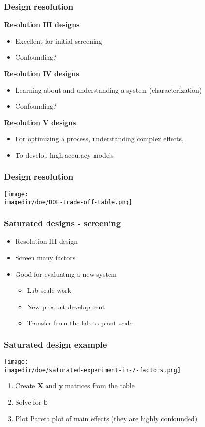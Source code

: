 \begin{frame}\frametitle{Design resolution}

	\textbf{Resolution III designs }
	\begin{itemize}
		\item	Excellent for initial screening
		\item	Confounding?
	\end{itemize}

	\textbf{Resolution IV designs }
	\begin{itemize}
		\item	Learning about and understanding a system (characterization)
		\item	Confounding?
	\end{itemize}

	\textbf{Resolution V designs}
	\begin{itemize}
		\item	For optimizing a process, understanding complex effects,
		\item	To develop high-accuracy models
	\end{itemize}
\end{frame}

\begin{frame}\frametitle{Design resolution}
	\begin{center}
		\texttt{[image: \\imagedir/doe/DOE-trade-off-table.png]}
	\end{center}
\end{frame}

\begin{frame}\frametitle{Saturated designs - screening}
	\begin{itemize}
		\item	Resolution III design
		\item	Screen many factors
		\item	Good for evaluating a new system
		\begin{itemize}
			\item	Lab-scale work
			\item	New product development
			\item	Transfer from the lab to plant scale
		\end{itemize}
	\end{itemize}
\end{frame}

\begin{frame}\frametitle{Saturated design example}
	\begin{center}
		\texttt{[image: \\imagedir/doe/saturated-experiment-in-7-factors.png]}
	\end{center}
	\begin{enumerate}
		\item	Create $\mathbf{X}$ and $\mathbf{y}$ matrices from the table
		\item	Solve for $\mathbf{b}$
		\item	Plot Pareto plot of main effects (they are highly confounded)
	\end{enumerate}
\end{frame}

